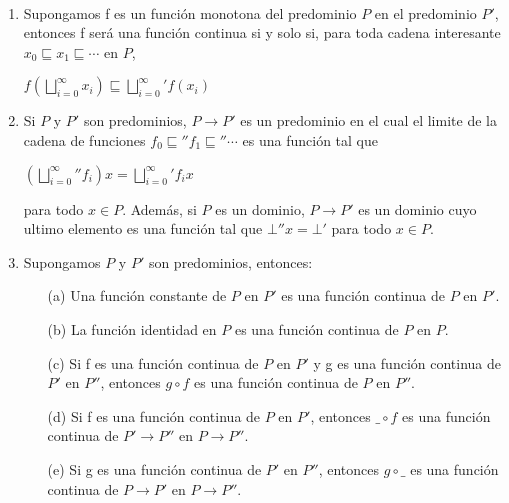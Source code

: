\begin{proposition}\

\begin{enumerate}

\item Supongamos f es un funci\'on monotona del predominio $P$ en el predominio $P'$,
entonces f ser\'a una funci\'on continua si y solo si, para toda cadena
interesante $x_0 \sqsubseteq x_1 \sqsubseteq \cdots$ en $P$,

\begin{center}
$f (\bigsqcup\limits^{\infty}_{i=0} x_i) \sqsubseteq {\bigsqcup\limits^{\infty}_{i=0}}' f (x_i)$
\end{center}

\item Si $P$ y $P'$ son predominios, $P \rightarrow P'$ es un predominio en
el cual el limite de la cadena de funciones $f_0 \sqsubseteq'' f_1 \sqsubseteq'' \cdots$ 
es una funci\'on tal que 

\begin{center}
$({\bigsqcup\limits^{\infty}_{i=0}}'' f_{i})x = {\bigsqcup\limits^{\infty}_{i=0}}' f_{i} x$
\end{center}

para todo $x \in P$. Adem\'as, si $P$ es un dominio, $P \rightarrow P'$ es un dominio
cuyo ultimo elemento es una funci\'on tal que $\bot'' x = \bot'$ para todo $x \in P$.

\item Supongamos $P$ y $P'$ son predominios, entonces:

\begin{enumerate}
\item[(a)] Una funci\'on constante de $P$ en $P'$ es una funci\'on continua de $P$ en $P'$.\\

\item[(b)] La funci\'on identidad en $P$ es una funci\'on continua de $P$ en $P$.\\

\item[(c)] Si f es una funci\'on continua de $P$ en $P'$ y g es una funci\'on
continua de $P'$ en $P''$, entonces $g \circ f$ es una funci\'on continua de $P$ en $P''$.\\

\item[(d)] Si f es una funci\'on continua de $P$ en $P'$, entonces $\_ \circ f$ es una funci\'on
continua de $P' \rightarrow P''$ en $P \rightarrow P''$.\\

\item[(e)] Si g es una funci\'on continua de $P'$ en $P''$, entonces $g \circ \_$ es una funci\'on
continua de $P \rightarrow P'$ en $P \rightarrow P''$.

\end{enumerate}

\end{enumerate}

\end{proposition}

